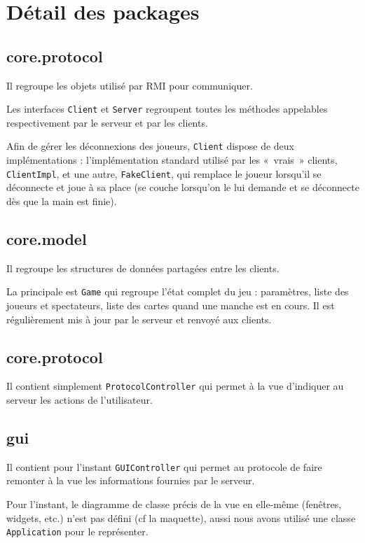 \section{Détail des packages}

\subsection{core.protocol}

Il regroupe les objets utilisé par RMI pour communiquer.

Les interfaces \texttt{Client} et \texttt{Server} regroupent toutes les méthodes appelables respectivement par le serveur et par les clients.

Afin de gérer les déconnexions des joueurs, \texttt{Client} dispose de deux implémentations : l'implémentation standard utilisé par les «~vrais~» clients, \texttt{ClientImpl}, et une autre, \texttt{FakeClient}, qui remplace le joueur lorsqu'il se déconnecte et joue à sa place (se couche lorsqu'on le lui demande et se déconnecte dès que la main est finie).

\subsection{core.model}

Il regroupe les structures de données partagées entre les clients.

La principale est \texttt{Game} qui regroupe l'état complet du jeu : paramètres, liste des joueurs et spectateurs, liste des cartes quand une manche est en cours.
Il est régulièrement mis à jour par le serveur et renvoyé aux clients.

\subsection{core.protocol}

Il contient simplement \texttt{ProtocolController} qui permet à la vue d'indiquer au serveur les actions de l'utilisateur.

\subsection{gui}

Il contient pour l'instant \texttt{GUIController} qui permet au protocole de faire remonter à la vue les informations fournies par le serveur.

Pour l'instant, le diagramme de classe précis de la vue en elle-même (fenêtres, widgets, etc.) n'est pas défini (cf la maquette), aussi nous avons utilisé une classe \texttt{Application} pour le représenter.
